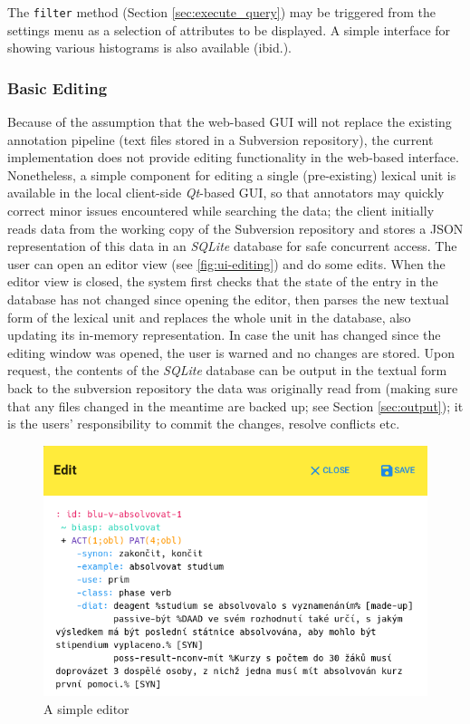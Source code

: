 \documentclass[10pt, a4paper]{article}
\begin{document}
The \texttt{filter} method (Section \ref{sec:execute_query}) may be triggered from the settings menu as a selection of attributes to be displayed.
A simple interface for showing various histograms is also available (ibid.).


\subsubsection{Basic Editing}
Because of the assumption that the web-based GUI will not replace the existing annotation pipeline
(text files stored in a Subversion repository),
the current implementation does not provide editing functionality in the web-based interface.
Nonetheless, a simple component for editing a single (pre-existing) lexical unit is available
in the local client-side \emph{Qt}-based GUI,
so that annotators may quickly correct minor issues encountered while searching the data;
the client initially reads data from the working copy of the Subversion repository and stores a JSON
representation of this data in an \emph{SQLite} database for safe concurrent access.
The user can open an editor view (see \autoref{fig:ui-editing}) and do some edits. When the editor
view is closed, the system first checks that the state of the entry in the database has not changed since opening the editor, then parses the new textual form of the lexical unit and replaces the whole unit in the database,
also updating its in-memory representation. In case the unit has changed since the editing window was opened,
the user is warned and no changes are stored. Upon request, the contents of the \emph{SQLite} database can be output in the textual form back to the subversion repository the data was originally read from (making sure that any files changed in the meantime are backed up; see Section \ref{sec:output}); it is the users' responsibility to commit the changes, resolve conflicts etc.


\begin{figure}
    \includegraphics[width=\hsize]{images/ui-editing.png}
    \caption{\label{fig:ui-editing}A simple editor}
\end{figure}
\end{document}
